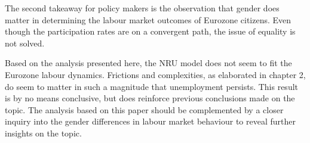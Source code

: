 \documentclass[12pt,a4paper,english]{article}
\begin{document}
The second takeaway for policy makers is the observation that gender does matter in determining the labour market outcomes of Eurozone citizens. Even though the participation rates are on a convergent path, the issue of equality is not solved. 

Based on the analysis presented here, the NRU model does not seem to fit the Eurozone labour dynamics. Frictions and complexities, as elaborated in chapter 2, do seem to matter in such a magnitude that unemployment persists. This result is by no means conclusive, but does reinforce previous conclusions made on the topic. The analysis based on this paper should be complemented by a closer inquiry into the gender differences in labour market behaviour to reveal further insights on the topic.






\clearpage


	



\clearpage
\end{document}
